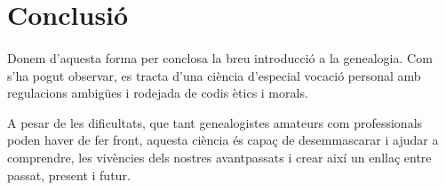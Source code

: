 \section{Conclusió}

    \paragraph{}
    Donem d'aquesta forma per conclosa la breu introducció a la genealogia. Com s'ha pogut observar, es tracta d'una ciència d'especial vocació personal amb regulacions ambigües i rodejada de codis ètics i morals.

    A pesar de les dificultats, que tant genealogistes amateurs com professionals poden haver de fer front, aquesta ciència és capaç de desemmascarar i ajudar a comprendre, les vivències dels nostres avantpassats i crear així un enllaç entre passat, present i futur.
